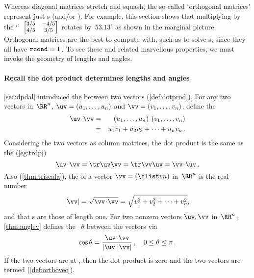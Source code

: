 
Whereas diagonal matrices stretch and squash, the so-called 
`orthogonal matrices' represent just s (and/or ).
%
For example, this section shows that multiplying by the `'~\(\footnotesize\begin{bmatrix} 3/5&-4/5\\4/5&3/5 \end{bmatrix}\) rotates by~\(53.13^\circ\) as shown in the marginal picture.
Orthogonal matrices are the best to compute with, such as to solve s, since they all have \(\verb|rcond|=1\)\,.
To see these and related marvellous properties, we must invoke the geometry of lengths and angles.


\paragraph{Recall the dot product determines lengths and angles}
\autoref{sec:dpdal} introduced the  between two vectors (\autoref{def:dotprod}).
For any two vectors in~\(\RR^n\), $\uv=(u_1,\ldots,u_n)$ and $\vv=(v_1,\ldots,v_n)$,
define the  
\begin{eqnarray*}
\uv\cdot \vv&=&(u_1,\ldots,u_n)\cdot (v_1,\ldots,v_n)
\\&=& u_1v_1+u_2v_2+\cdots+u_nv_n\,.
\end{eqnarray*}
Considering the two vectors as column matrices, the dot product is the same as the  (\autoref{eg:trdp})
\begin{equation*}
\uv\cdot\vv=\tr\uv\vv=\tr\vv\uv=\vv\cdot\uv\,.
\end{equation*}
Also (\autoref{thm:triscala}), the  of a vector \(\vv=(\hlist vn)\) in~\(\RR^n\) is the real number  
\begin{equation*}
|\vv|=\sqrt{\vv\cdot\vv}=\sqrt{v_1^2+v_2^2+\cdots+v_n^2},
\end{equation*}
and that s are those of length one.
For two nonzero vectors \(\uv,\vv\) in~\(\RR^n\), \autoref{thm:anglev} defines the ~\(\theta\) between the vectors via 
\begin{equation*}
\cos\theta=\frac{\uv\cdot\vv}{|\uv||\vv|}\,,
\quad 0\leq\theta\leq\pi\,.
\end{equation*}
If the two vectors are at , then the dot product is zero and the two vectors are termed  (\autoref{def:orthovec}).









